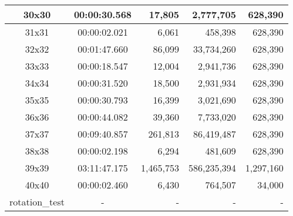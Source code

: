 \begin{center}
\begin{tabular}{|c|c|r|r|r|}
		30x30 & 00:00:30.568 & 17,805 & 2,777,705 & 628,390 \\ \hline
		31x31 & 00:00:02.021 & 6,061 & 458,398 & 628,390 \\ \hline
		32x32 & 00:01:47.660 & 86,099 & 33,734,260 & 628,390 \\ \hline
		33x33 & 00:00:18.547 & 12,004 & 2,941,736 & 628,390 \\ \hline
		34x34 & 00:00:31.520 & 18,500 & 2,931,934 & 628,390 \\ \hline
		35x35 & 00:00:30.793 & 16,399 & 3,021,690 & 628,390 \\ \hline
		36x36 & 00:00:44.082 & 39,360 & 7,733,020 & 628,390 \\ \hline
		37x37 & 00:09:40.857 & 261,813 & 86,419,487 & 628,390 \\ \hline
		38x38 & 00:00:02.198 & 6,294 & 481,609 & 628,390 \\ \hline
		39x39 & 03:11:47.175 & 1,465,753 & 586,235,394 & 1,297,160 \\ \hline
		40x40 & 00:00:02.460 & 6,430 & 764,507 & 34,000 \\ \hline
		rotation\_test & - & - & - & - \\ \hline

    \end{tabular}
\end{center}
